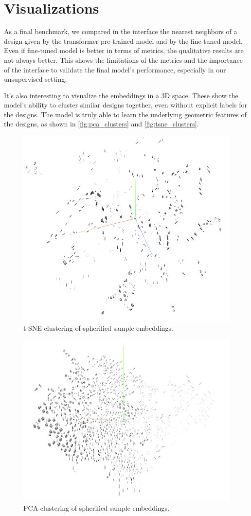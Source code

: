 \section{Visualizations}

As a final benchmark, we compared in the interface the nearest neighbors of a design given by the transformer pre-trained model and by the fine-tuned model. Even if fine-tuned model is better in terms of metrics, the qualitative results are not always better. This shows the limitations of the metrics and the importance of the interface to validate the final model's performance, especially in our unsupervised setting.

It's also interesting to visualize the embeddings in a 3D space. These show the model's ability to cluster similar designs together, even without explicit labels for the designs. 
The model is truly able to learn the underlying geometric features of the designs, as shown in \autoref{fig:pca_clusters} and \autoref{fig:tsne_clusters}.
\begin{figure}[h]
    \centering
    \includegraphics[width=0.9\columnwidth]{images/clusters_tsne.png}
    \caption{t-SNE clustering of spherified sample embeddings.}
    \label{fig:tsne_clusters}
\end{figure}

\begin{figure}[h]
    \centering
    \includegraphics[width=0.9\columnwidth]{images/clusters_pca.png}
    \caption{PCA clustering of spherified sample embeddings.}
    \label{fig:pca_clusters}
\end{figure}

